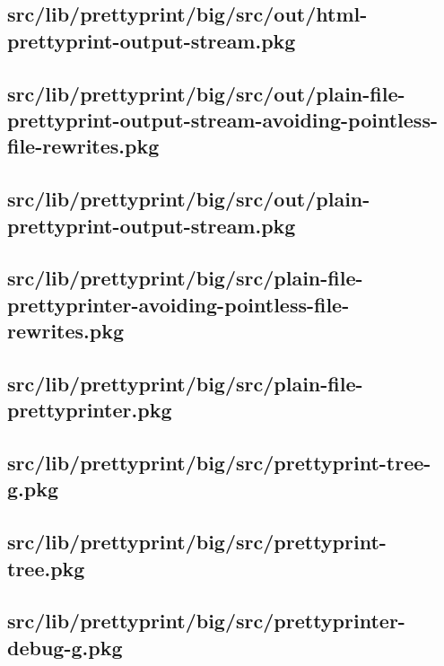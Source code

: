 \subsection{src/lib/prettyprint/big/src/out/html-prettyprint-output-stream.pkg}


\subsection{src/lib/prettyprint/big/src/out/plain-file-prettyprint-output-stream-avoiding-pointless-file-rewrites.pkg}


\subsection{src/lib/prettyprint/big/src/out/plain-prettyprint-output-stream.pkg}


\subsection{src/lib/prettyprint/big/src/plain-file-prettyprinter-avoiding-pointless-file-rewrites.pkg}


\subsection{src/lib/prettyprint/big/src/plain-file-prettyprinter.pkg}


\subsection{src/lib/prettyprint/big/src/prettyprint-tree-g.pkg}


\subsection{src/lib/prettyprint/big/src/prettyprint-tree.pkg}


\subsection{src/lib/prettyprint/big/src/prettyprinter-debug-g.pkg}


